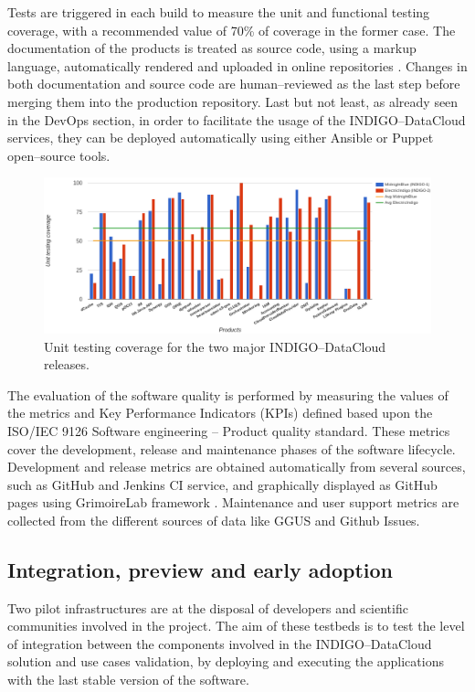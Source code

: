 \documentclass[journal]{IEEEtran}
\begin{document}
Tests are triggered in each build to measure the unit and functional testing coverage, with a recommended value of 70\% of coverage in the former case. The documentation of the products is treated as source code, using a markup language, automatically rendered and uploaded in online repositories \cite{indigo-gitbook}. Changes in both documentation and source code are human--reviewed as the last step before merging them into the production repository. Last but not least, as already seen in the DevOps section, in order to facilitate the usage of the INDIGO--DataCloud services, they can be deployed automatically using either Ansible \cite{indigo-ansible} or Puppet \cite{indigo-puppet} open--source tools.

\begin{figure}
\centering
\includegraphics[width=\textwidth]{images/unittest.png}
\caption{Unit testing coverage for the two major INDIGO--DataCloud releases.}
\label{fig:fig_unittest}
\end{figure}

The evaluation of the software quality is performed by measuring the values of the metrics and Key Performance Indicators (KPIs) defined based upon the ISO/IEC 9126 Software engineering -- Product quality standard. These metrics cover the development, release and maintenance phases of the software lifecycle. Development and release metrics are obtained automatically from several sources, such as GitHub and Jenkins CI service, and graphically displayed as GitHub pages using GrimoireLab framework \cite{grimoirelab}. Maintenance and user support metrics are collected from the different sources of data like GGUS \cite{ggus} and Github Issues.

\subsection{Integration, preview and early adoption}

Two pilot infrastructures are at the disposal of developers and scientific communities involved in the project. The aim of these testbeds is to test the level of integration between the components involved in the INDIGO--DataCloud solution and use cases validation, by deploying and executing the applications with the last stable version of the software.
\end{document}
